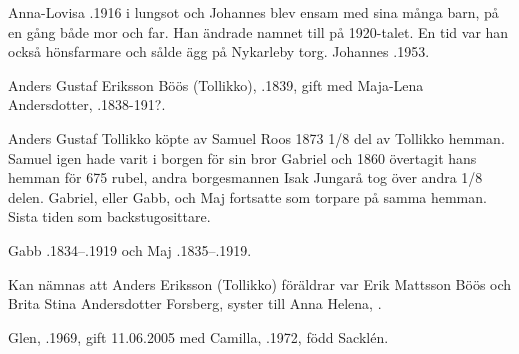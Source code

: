 Anna-Lovisa .1916 i lungsot och Johannes blev ensam med sina många barn, på en gång både mor och far. Han ändrade namnet till  på 1920-talet. En tid var han också hönsfarmare och sålde ägg på Nykarleby torg. Johannes .1953.


%
Anders Gustaf Eriksson Böös (Tollikko), .1839, gift med Maja-Lena Andersdotter, .1838-191?.
\begin{jhchildren}
  \item {}
  \item {}
  \item {}
  \item {}
\end{jhchildren}
Anders Gustaf Tollikko köpte av Samuel Roos 1873 1/8 del av Tollikko 	hemman. Samuel igen hade varit i borgen för sin bror Gabriel och 1860 övertagit hans hemman för 675 rubel, andra borgesmannen Isak Jungarå tog över andra 1/8 delen. Gabriel, eller Gabb, och Maj fortsatte som torpare på samma hemman. Sista tiden som backstugosittare.

Gabb .1834--.1919 och Maj .1835--.1919.

Kan nämnas att Anders Eriksson (Tollikko) föräldrar var Erik	Mattsson Böös och Brita Stina Andersdotter Forsberg, syster till Anna Helena, .



%



%
Glen, .1969, gift 11.06.2005 med Camilla, .1972, född Sacklén.
\begin{jhchildren}
  \item {}
  \item {}
  \item {}
\end{jhchildren}

